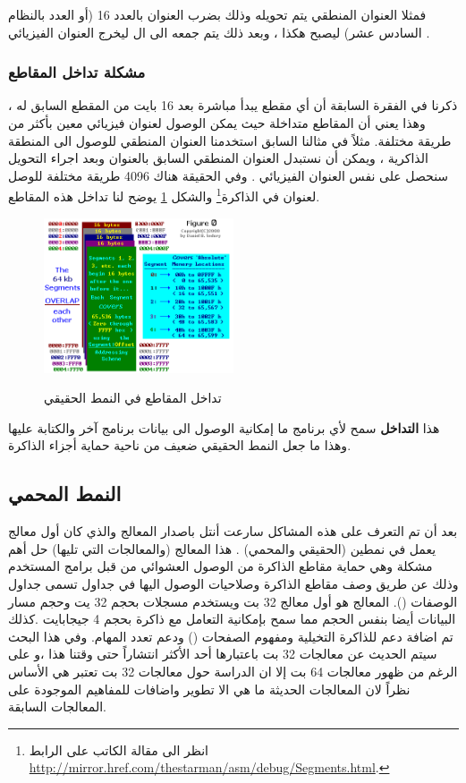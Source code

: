 \documentclass[document.tex]{subfiles}
\begin{document}
فمثلا العنوان المنطقي  يتم تحويله وذلك بضرب العنوان  بالعدد 16 (أو العدد  بالنظام السادس عشر) ليصبح هكذا ، وبعد ذلك يتم جمعه الى ال  ليخرج العنوان الفيزيائي .  

\subsubsection{مشكلة تداخل المقاطع}
ذكرنا في الفقرة السابقة أن أي مقطع يبدأ مباشرة بعد 16 بايت من المقطع السابق له ، وهذا يعني أن المقاطع متداخلة حيث يمكن الوصول لعنوان فيزيائي معين بأكثر من طريقة مختلفة. مثلاً في مثالنا السابق استخدمنا العنوان المنطقي  للوصول الى المنطقة الذاكرية  ، ويمكن أن نستبدل العنوان المنطقي السابق بالعنوان  وبعد اجراء التحويل سنحصل على نفس العنوان الفيزيائي . وفي الحقيقة هناك 4096 طريقة مختلفة للوصل لعنوان في الذاكرة\footnote{انظر الى مقالة الكاتب  على الرابط \url{http://mirror.href.com/thestarman/asm/debug/Segments.html}.} والشكل \ref{fig:mem_seg} يوضح لنا تداخل هذه المقاطع.

\begin{figure}[h!]
  \caption{تداخل المقاطع في النمط الحقيقي}
  \centering
   \includegraphics[width=0.5\textwidth]{../img/mem_seg}
  \label{fig:mem_seg} 
\end{figure}

هذا \textbf{التداخل } سمح لأي برنامج ما إمكانية الوصول الى بيانات برنامج آخر والكتابة عليها وهذا ما جعل النمط الحقيقي ضعيف من ناحية حماية أجزاء الذاكرة.

\subsection{النمط المحمي }
بعد أن تم التعرف على هذه المشاكل سارعت أنتل باصدار المعالج  والذي كان أول معالج يعمل في نمطين (الحقيقي والمحمي) . هذا المعالج (والمعالجات التي تليها) حل أهم مشكلة وهي حماية مقاطع الذاكرة من الوصول العشوائي من قبل برامج المستخدم وذلك عن طريق وصف مقاطع الذاكرة وصلاحيات الوصول اليها في جداول تسمى جداول الوصفات (). المعالج  هو أول معالج 32 بت ويستخدم مسجلات بحجم 32 يت وحجم مسار البيانات أيضا بنفس الحجم مما سمح بإمكانية التعامل مع ذاكرة بحجم 4 جيجابايت .كذلك تم اضافة دعم للذاكرة التخيلية ومفهوم الصفحات () ودعم تعدد المهام. وفي هذا البحث سيتم الحديث عن معالجات 32 بت باعتبارها أحد الأكثر انتشاراً حتى وقتنا هذا ،و على الرغم من ظهور معالجات 64 بت إلا ان الدراسة حول معالجات 32 بت تعتبر هي الأساس نظراً لان المعالجات الحديثة ما هي الا تطوير واضافات للمفاهيم الموجودة على المعالجات السابقة.
\end{document}
